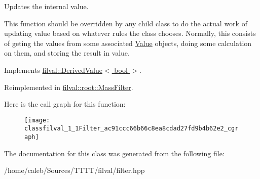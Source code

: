 Updates the internal value. 

This function should be overridden by any child class to do the actual work of updating value based on whatever rules the class chooses. Normally, this consists of geting the values from some associated \hyperlink{classfilval_1_1Value}{Value} objects, doing some calculation on them, and storing the result in value. 

Implements \hyperlink{classfilval_1_1DerivedValue_a74e04450a550454510329a9e6b941304}{filval\+::\+Derived\+Value$<$ bool $>$}.



Reimplemented in \hyperlink{classfilval_1_1root_1_1MassFilter_a7858ca9aab96796fdb071b9ed55c5745}{filval\+::root\+::\+Mass\+Filter}.

Here is the call graph for this function\+:
\nopagebreak
\begin{figure}[H]
\begin{center}
\leavevmode
\texttt{[image: classfilval\_1\_1Filter\_ac91ccc66b66c8ea8cdad27fd9b4b62e2\_cgraph]}
\end{center}
\end{figure}


The documentation for this class was generated from the following file\+:\begin{DoxyCompactItemize}
\item 
/home/caleb/\+Sources/\+T\+T\+T\+T/filval/filter.\+hpp\end{DoxyCompactItemize}
